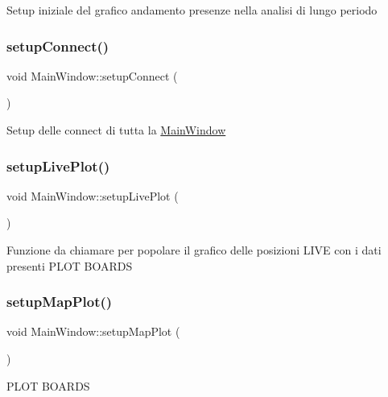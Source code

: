 Setup iniziale del grafico andamento presenze nella analisi di lungo periodo \mbox{\label{class_main_window_af0e6678a3e8aec9bd72220299c17825a}} 
\subsubsection{\texorpdfstring{setup\+Connect()}{setupConnect()}}
{\footnotesize\ttfamily void Main\+Window\+::setup\+Connect (\begin{DoxyParamCaption}{ }\end{DoxyParamCaption})}

Setup delle connect di tutta la \hyperlink{class_main_window}{Main\+Window} \mbox{\label{class_main_window_a0d3c324e794a29ad0b3d54a098f86d5c}} 
\subsubsection{\texorpdfstring{setup\+Live\+Plot()}{setupLivePlot()}}
{\footnotesize\ttfamily void Main\+Window\+::setup\+Live\+Plot (\begin{DoxyParamCaption}{ }\end{DoxyParamCaption})}

Funzione da chiamare per popolare il grafico delle posizioni L\+I\+VE con i dati presenti P\+L\+OT B\+O\+A\+R\+DS \mbox{\label{class_main_window_aa09367d7985f9b85de28c04d7f2bb255}} 
\subsubsection{\texorpdfstring{setup\+Map\+Plot()}{setupMapPlot()}}
{\footnotesize\ttfamily void Main\+Window\+::setup\+Map\+Plot (\begin{DoxyParamCaption}{ }\end{DoxyParamCaption})}

P\+L\+OT B\+O\+A\+R\+DS \mbox{\label{class_main_window_ac5366ffa03d44a3a76e4fb259676f8e5}} 
